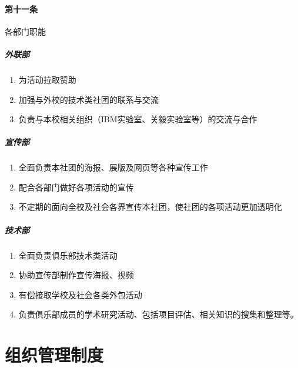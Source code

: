 \documentclass{club}
\begin{document}
\paragraph{第十一条}各部门职能
\subparagraph{外联部}
\begin{enumerate}
    \item 为活动拉取赞助
    \item 加强与外校的技术类社团的联系与交流
    \item 负责与本校相关组织（IBM实验室、关毅实验室等）的交流与合作
\end{enumerate}
\subparagraph{宣传部}
\begin{enumerate}
    \item 全面负责本社团的海报、展版及网页等各种宣传工作
    \item 配合各部门做好各项活动的宣传
    \item 不定期的面向全校及社会各界宣传本社团，使社团的各项活动更加透明化
\end{enumerate}
\subparagraph{技术部}
\begin{enumerate}
    \item 全面负责俱乐部技术类活动
    \item 协助宣传部制作宣传海报、视频
    \item 有偿接取学校及社会各类外包活动
    \item 负责俱乐部成员的学术研究活动、包括项目评估、相关知识的搜集和整理等。
\end{enumerate}

\section{组织管理制度}
\end{document}
